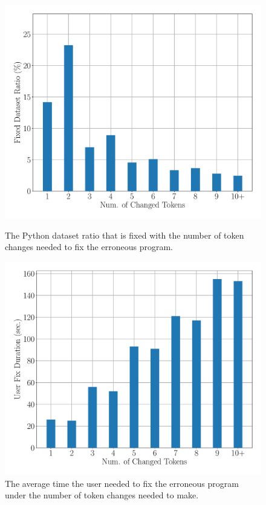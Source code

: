\begin{figure}[t]
  \centering
  \begin{minipage}[c]{0.49\linewidth}
    \centering
    \includegraphics[width=\linewidth]{dataset-ratio-per-change.pdf}
    \caption{The Python dataset ratio that is fixed with the number of token
     changes needed to fix the erroneous program.}
    \label{fig:token-changes-ratio}
  \end{minipage}
  \begin{minipage}[c]{0.5\linewidth}
      \centering
      \includegraphics[width=\linewidth]{median-repair-times.pdf}
      \caption{The average time the user needed to fix the erroneous program
      under the number of token changes needed to make.}
      \label{fig:token-changes}
  \end{minipage}
\end{figure}

